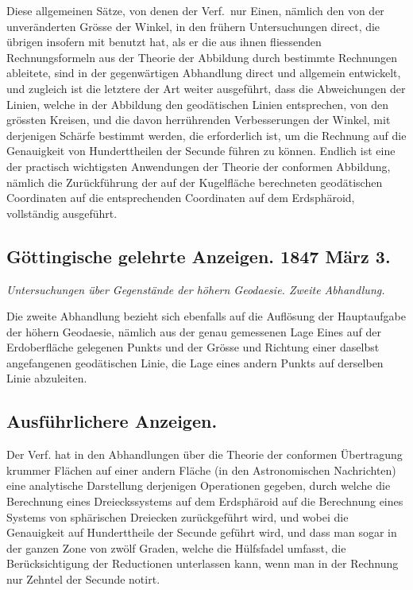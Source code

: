 \documentclass[fontsize=10pt,paper=a5,pagesize,headings=small,headinclude=true,footinclude=true]{scrbook}
\begin{document}
Diese allgemeinen Sätze, von denen der Verf.~nur Einen, nämlich den von der unveränderten Grösse der Winkel, in den frühern Untersuchungen direct, die übrigen insofern mit benutzt hat, als er die aus ihnen fliessenden Rechnungsformeln aus der Theorie der Abbildung durch bestimmte Rechnungen ableitete, sind in der gegenwärtigen Abhandlung direct und allgemein entwickelt, und zugleich ist die letztere der Art weiter ausgeführt, dass die Abweichungen der Linien, welche in der Abbildung den geodätischen Linien entsprechen, von den grössten Kreisen, und die davon herrührenden Verbesserungen der Winkel, mit derjenigen Schärfe bestimmt werden, die erforderlich ist, um die Rechnung auf die Genauigkeit von Hunderttheilen der Secunde führen zu können. Endlich ist eine der practisch wichtigsten Anwendungen der Theorie der conformen Abbildung, nämlich die Zurückführung der auf der Kugelfläche berechneten geodätischen Coordinaten auf die entsprechenden Coordinaten auf dem Erdsphäroid, vollständig ausgeführt.

\subsection*{Göttingische gelehrte Anzeigen. 1847 März 3.}

\textit{Untersuchungen über Gegenstände der höhern Geodaesie. Zweite Abhandlung.}

Die zweite Abhandlung bezieht sich ebenfalls auf die Auflösung der Hauptaufgabe der höhern Geodaesie, nämlich aus der genau gemessenen Lage Eines auf der Erdoberfläche gelegenen Punkts und der Grösse und Richtung einer daselbst angefangenen geodätischen Linie, die Lage eines andern Punkts auf derselben Linie abzuleiten.

\subsection*{Ausführlichere Anzeigen.}

Der Verf. hat in den Abhandlungen über die Theorie der conformen Übertragung krummer Flächen auf einer andern Fläche (in den Astronomischen Nachrichten) eine analytische Darstellung derjenigen Operationen gegeben, durch welche die Berechnung eines Dreieckssystems auf dem Erdsphäroid auf die Berechnung eines Systems von sphärischen Dreiecken zurückgeführt wird, und wobei die Genauigkeit auf Hunderttheile der Secunde geführt wird, und dass man sogar in der ganzen Zone von zwölf Graden, welche die Hülfsfadel umfasst, die Berücksichtigung der Reductionen unterlassen kann, wenn man in der Rechnung nur Zehntel der Secunde notirt.
\end{document}
